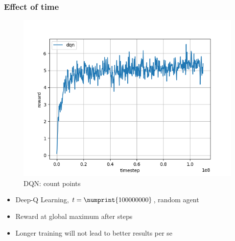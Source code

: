 \begin{frame}
\frametitle{Effect of time}

\begin{figure}
\includegraphics[height=.4\textheight]{dqn_custom-payoff_result_long-run.png}
\caption{DQN: count points}
\end{figure}

\begin{itemize}
\item Deep-Q Learning, $t = \numprint{100000000}$, random agent
\item Reward at global maximum after  steps
\item Longer training will not lead to better results per se
\end{itemize}
\end{frame}


